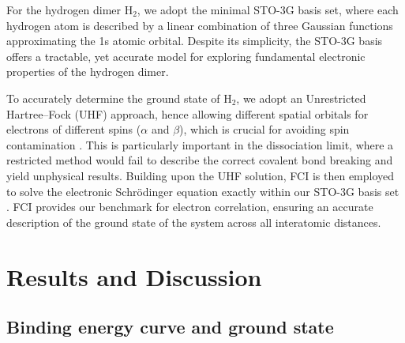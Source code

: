 \documentclass[aps, prl, twocolumn, groupedaddress, reprint, floatfix, nofootinbib, longbibliography]{revtex4-2}
\begin{document}
    For the hydrogen dimer H$_2$, we adopt the minimal STO-3G basis set, where each hydrogen atom is described by a linear combination of three Gaussian functions approximating the 1s atomic orbital. Despite its simplicity, the STO-3G basis offers a tractable, yet accurate model for exploring fundamental electronic properties of the hydrogen dimer.

    To accurately determine the ground state of H$_2$, we adopt an Unrestricted Hartree--Fock (UHF) approach, hence allowing different spatial orbitals for electrons of different spins ($\alpha$ and $\beta$), which is crucial for avoiding spin contamination \cite{szabo1996modern, helgaker2013molecular}. This is particularly important in the dissociation limit, where a restricted method would fail to describe the correct covalent bond breaking and yield unphysical results. Building upon the UHF solution, FCI is then employed to solve the electronic Schrödinger equation exactly within our STO-3G basis set \cite{hehre1969self}. FCI provides our benchmark for electron correlation, ensuring an accurate description of the ground state of the system across all interatomic distances.

\section{Results and Discussion}

    \subsection{Binding energy curve and ground state}
\end{document}
